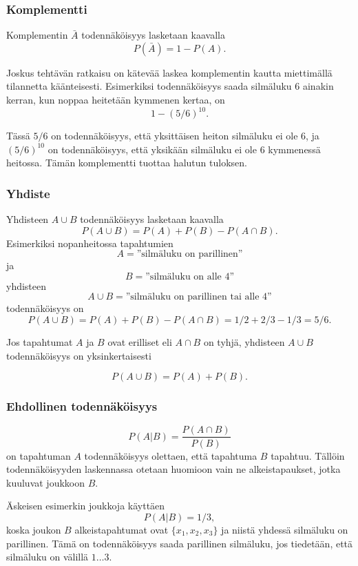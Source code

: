 \subsubsection{Komplementti}

Komplementin $\bar A$
todennäköisyys lasketaan kaavalla
\[P(\bar A)=1-P(A).\]

Joskus tehtävän ratkaisu on kätevää
laskea komplementin kautta
miettimällä tilannetta käänteisesti.
Esimerkiksi todennäköisyys saada
silmäluku 6 ainakin kerran,
kun noppaa heitetään kymmenen kertaa,
on
\[1-(5/6)^{10}.\]

Tässä $5/6$ on todennäköisyys,
että yksittäisen heiton silmäluku ei ole 6,
ja $(5/6)^{10}$ on todennäköisyys, että yksikään
silmäluku ei ole 6 kymmenessä heitossa.
Tämän komplementti tuottaa halutun tuloksen.

\subsubsection{Yhdiste}

Yhdisteen $A \cup B$ todennäköisyys lasketaan kaavalla 
\[P(A \cup B)=P(A)+P(B)-P(A \cap B).\]
Esimerkiksi nopanheitossa tapahtumien
\[A=\textrm{''silmäluku on parillinen''}\]
ja
\[B=\textrm{''silmäluku on alle 4''}\]
yhdisteen
\[A \cup B=\textrm{''silmäluku on parillinen tai alle 4''}\]
todennäköisyys on
\[P(A \cup B) = P(A)+P(B)-P(A \cap B)=1/2+2/3-1/3=5/6.\]

Jos tapahtumat $A$ ja $B$ ovat erilliset eli $A \cap B$ on tyhjä,
yhdisteen $A \cup B$ todennäköisyys on yksinkertaisesti

\[P(A \cup B)=P(A)+P(B).\]

\subsubsection{Ehdollinen todennäköisyys}


\[P(A | B) = \frac{P(A \cap B)}{P(B)}\]
on tapahtuman $A$ todennäköisyys
olettaen, että tapahtuma $B$ tapahtuu.
Tällöin todennäköisyyden laskennassa otetaan
huomioon vain ne alkeistapaukset,
jotka kuuluvat joukkoon $B$.

Äskeisen esimerkin joukkoja käyttäen
\[P(A | B)= 1/3,\]
koska joukon $B$ alkeistapahtumat ovat
$\{x_1,x_2,x_3\}$ ja niistä yhdessä
silmäluku on parillinen.
Tämä on todennäköisyys saada parillinen silmäluku,
jos tiedetään, että silmäluku on välillä $1 \ldots 3$.

